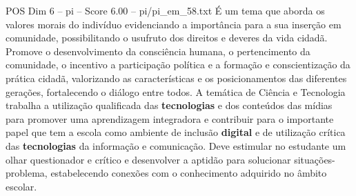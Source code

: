 \begin{textsample}{POS Dim 6 – pi – Score 6.00 – pi/pi\_em\_58.txt}
É um tema que aborda os valores morais do indivíduo evidenciando a importância para a sua inserção em comunidade, possibilitando o usufruto dos direitos e deveres da vida cidadã.
Promove o desenvolvimento da consciência humana, o pertencimento da comunidade, o incentivo a participação política e a formação e conscientização da prática cidadã, valorizando as características e os posicionamentos das diferentes gerações, fortalecendo o diálogo entre todos.
A temática de Ciência e Tecnologia trabalha a utilização qualificada das \textbf{tecnologias} e dos conteúdos das mídias para promover uma aprendizagem integradora e contribuir para o importante papel que tem a escola como ambiente de inclusão \textbf{digital} e de utilização crítica das \textbf{tecnologias} da informação e comunicação.
Deve estimular no estudante um olhar questionador e crítico e desenvolver a aptidão para solucionar situações-problema, estabelecendo conexões com o conhecimento adquirido no âmbito escolar.

\end{textsample}
